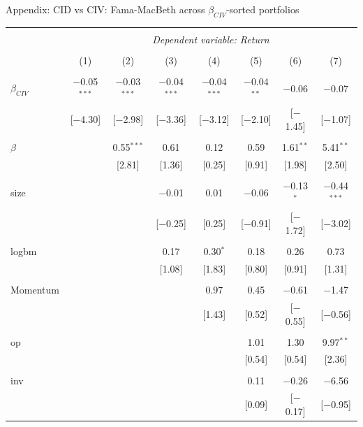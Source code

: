 \documentclass{beamer}
\begin{document}
{\renewcommand{\arraystretch}{0.50}
\begin{frame}{Appendix: CID vs CIV: Fama-MacBeth across $\beta_{CIV}$-sorted portfolios}
\vspace{-0.4cm}
\begin{table}[!htbp] \centering 
\begin{tabular}{@{\extracolsep{-2pt}}lccccccc} 
\\[-1.8ex]\hline 
\hline \\[-1.8ex] 
 & \multicolumn{7}{c}{\textit{Dependent variable: Return}} \\ 
\cline{2-8} 
\\[-1.8ex] & (1) & (2) & (3) & (4) & (5) & (6) & (7)\\ 
\hline \\[-1.0ex] 
 $\beta_{CIV}$ & $-$0.05$^{***}$ & $-$0.03$^{***}$ & $-$0.04$^{***}$ & $-$0.04$^{***}$ & $-$0.04$^{**}$ & $-$0.06 & $-$0.07 \\ 
  & [$-$4.30] & [$-$2.98] & [$-$3.36] & [$-$3.12] & [$-$2.10] & [$-$1.45] & [$-$1.07] \\ 
  & & & & & & & \\ 
 $\beta$ &  & 0.55$^{***}$ & 0.61 & 0.12 & 0.59 & 1.61$^{**}$ & 5.41$^{**}$ \\ 
  &  & [2.81] & [1.36] & [0.25] & [0.91] & [1.98] & [2.50] \\ 
  & & & & & & & \\ 
 size &  &  & $-$0.01 & 0.01 & $-$0.06 & $-$0.13$^{*}$ & $-$0.44$^{***}$ \\ 
  &  &  & [$-$0.25] & [0.25] & [$-$0.91] & [$-$1.72] & [$-$3.02] \\ 
  & & & & & & & \\ 
 logbm &  &  & 0.17 & 0.30$^{*}$ & 0.18 & 0.26 & 0.73 \\ 
  &  &  & [1.08] & [1.83] & [0.80] & [0.91] & [1.31] \\ 
  & & & & & & & \\ 
 Momentum &  &  &  & 0.97 & 0.45 & $-$0.61 & $-$1.47 \\ 
  &  &  &  & [1.43] & [0.52] & [$-$0.55] & [$-$0.56] \\ 
  & & & & & & & \\ 
 op &  &  &  &  & 1.01 & 1.30 & 9.97$^{**}$ \\ 
  &  &  &  &  & [0.54] & [0.54] & [2.36] \\ 
  & & & & & & & \\ 
 inv &  &  &  &  & 0.11 & $-$0.26 & $-$6.56 \\ 
  &  &  &  &  & [0.09] & [$-$0.17] & [$-$0.95] \\ 

\end{tabular}
\end{table}
\end{frame}}
\end{document}
